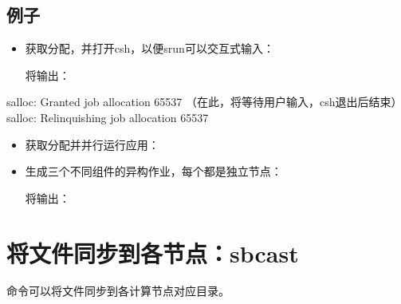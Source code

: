 \documentclass[a4paper,12pt,english]{sphinxmanual}
\begin{document}
\subsection{例子}
\label{\detokenize{slurm/slurm:id36}}\begin{itemize}
\item {} 
\sphinxAtStartPar
获取分配，并打开csh，以便srun可以交互式输入：

\sphinxAtStartPar
{}

\sphinxAtStartPar
将输出：

\end{itemize}

\begin{sphinxVerbatim}[commandchars=\\\{\}]
salloc: Granted job allocation 65537
（在此，将等待用户输入，csh退出后结束） salloc: Relinquishing job
allocation 65537
\end{sphinxVerbatim}
\begin{itemize}
\item {} 
\sphinxAtStartPar
获取分配并并行运行应用：

\sphinxAtStartPar
{}

\item {} 
\sphinxAtStartPar
生成三个不同组件的异构作业，每个都是独立节点：

\sphinxAtStartPar
{}

\sphinxAtStartPar
将输出：

\end{itemize}

\begin{sphinxVerbatim}[commandchars=\\\{\}]
          
        
\end{sphinxVerbatim}


\section{将文件同步到各节点：sbcast}
\label{\detokenize{slurm/slurm:sbcast}}
\sphinxAtStartPar
{}命令可以将文件同步到各计算节点对应目录。
\end{document}
